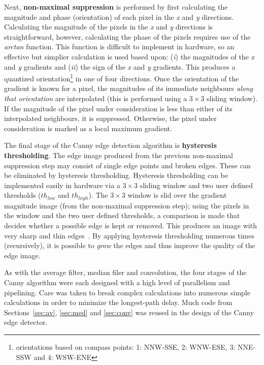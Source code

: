 \documentclass[10pt,twocolumn,letterpaper]{article}
\begin{document}
Next, {\bf non-maximal suppression} is performed by first calculating the magnitude and phase (orientation) of each pixel in the 
\emph{x} and \emph{y} directions. Calculating the magnitude of the pixels in the \emph{x} and \emph{y} directions is straightforward, however,
calculating the phase of the pixels requires use of the 
\emph{arctan} function. This function is difficult to implement in hardware,
so an effective but simplier calculation is used based upon: (\emph{i}) the magnitudes of the \emph{x} and \emph{y} gradients and 
(\emph{ii}) the sign of the \emph{x} and \emph{y} gradients. This produces a quantized orientation\footnote{orientations
based on compass points: 1: NNW-SSE, 2: WNW-ESE, 3: NNE-SSW and 4: WSW-ENE} in one of four directions.
Once the orientation of the gradient is known for a pixel, the magnitudes of its immediate neighbours \emph{along that orientation} 
are interpolated
(this is performed using a $3\times3$ sliding window).
If the magnitude of the pixel under consideration is less than either of its interpolated neighbours, it is suppressed. Otherwise, the
pixel under consideration is marked as a local maximum gradient.

The final stage of the Canny edge detection algorithm is {\bf hysteresis thresholding}. The edge image produced from the previous
non-maximal suppression step may consist of single edge points and broken edges. These can be eliminated by 
hysteresis thresholding. Hysteresis thresholding can be implemented easily in hardware via a $3\times3$ sliding window and two 
user defined thresholds ($th_{low}$ and $th_{high}$). 
The $3\times3$ window is slid over the gradient magnitude image (from the non-maximal suppression step); using the pixels in the window 
and the two user defined thresholds, a comparison is made that decides whether a possible edge is kept or removed. This 
produces an image with very sharp and thin edges~\cite{IPtechreport_MSThesis}.
By applying hysteresis thresholding numerous times (recursively), it is possible to \emph{grow} the edges and thus improve
the quality of the edge image.

As with the average filter, median filer and convolution, the 
four stages of the Canny algorithm were each designed with a high level of parallelism and pipelining.
Care was taken to break complex calculations into numerous simple calculations in order to minimize the longest-path delay.
Much code from Sections~\ref{sec:av}, \ref{sec:med} and \ref{sec:conv} was reused in the design of the Canny edge detector.
\end{document}
